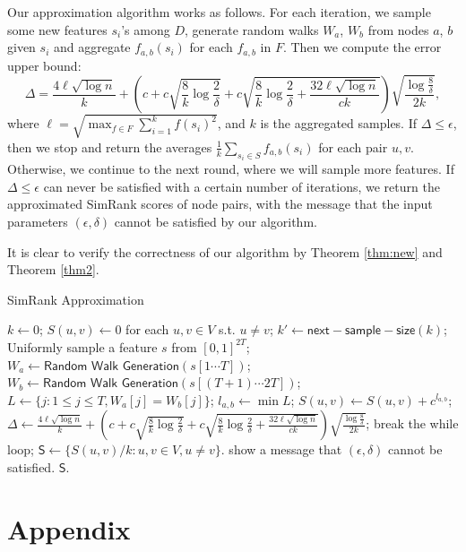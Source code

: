\documentclass{article}
\begin{document}
Our approximation algorithm works as follows. For each iteration, we sample some new features $s_i$'s among $D$, generate random walks $W_a$, $W_b$ from nodes $a$, $b$ given $s_i$ and aggregate $f_{a,b}(s_i)$ for each $f_{a,b}$ in $F$. Then we compute the error upper bound:
$$\Delta = \frac{4\ell\sqrt{\log n}}{k} +\left(c+c\sqrt{\frac{8}{k}\log \frac{2}{\delta}} + c\sqrt{\frac{8}{k}\log \frac{2}{\delta} + \frac{32\ell\sqrt{\log n}}{ck}}\right)\sqrt{\frac{\log \frac{8}{\delta}}{2k}},$$
where $\ell = \sqrt{\max_{f\in F} \sum_{i=1}^k f(s_i)^2}$, and $k$ is the aggregated samples. 
If $\Delta \leq \epsilon$, then we stop and return the averages $\frac{1}{k}\sum_{s_i\in S}f_{a,b}(s_i)$ for each pair $u, v$. Otherwise, we continue to the next round, where we will sample more features. If $\Delta \leq \epsilon$ can never be satisfied with a certain number of iterations, we return the approximated SimRank scores of node pairs, with the message that the input parameters $(\epsilon,\delta)$ cannot be satisfied by our algorithm.

It is clear to verify the correctness of our algorithm by Theorem \ref{thm:new} and Theorem \ref{thm2}.

\begin{algorithm}[!t]
\caption{\textsf{SimRank Approximation}}
\label{alg:sra}
\renewcommand{\algorithmicrequire}{\textbf{Input:}}
\renewcommand{\algorithmicensure}{\textbf{Output:}}
\begin{algorithmic}
\State $k \gets 0$;
\State $S(u,v) \gets 0$ for each $u, v \in V$ s.t. $u\not= v$;
	\State $k' \gets \mathsf{next-sample-size}(k)$;
		\State Uniformly sample a feature $s$ from $[0,1]^{2T}$;
			\State $W_a \gets \textsf{Random Walk Generation}(s[1\cdots T])$;
			\State $W_b \gets \textsf{Random Walk Generation}(s[(T+1)\cdots 2T])$;
			\State $L \gets \{j: 1\leq j\leq T, W_a[j] = W_b[j]\}$;
				\State $l_{a,b} \gets \min L$;
				\State $S(u,v) \gets S(u,v)+c^{l_{a,b}}$;
			\EndIf
		\EndFor
	\EndFor
	\State $\Delta \gets \frac{4\ell\sqrt{\log n}}{k} +\left(c+c\sqrt{\frac{8}{k}\log \frac{2}{\delta}} + c\sqrt{\frac{8}{k}\log \frac{2}{\delta} + \frac{32\ell\sqrt{\log n}}{ck}}\right)\sqrt{\frac{\log \frac{8}{\delta}}{2k}}$;
	\If {$\Delta \leq \epsilon$}
		\State break the while loop;
	\EndIf
\EndFor
\State $\mathsf{S} \gets \{S(u,v)/k : u,v\in V, u\not=v\}$.
	\State show a message that $(\epsilon,\delta)$ cannot be satisfied.
\EndIf
{} $\mathsf{S}$.
\end{algorithmic}
\end{algorithm}

%



\section{Appendix}

\end{document}
